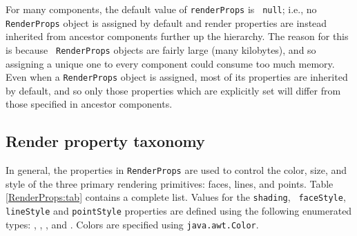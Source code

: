 For many components, the default value of {\tt renderProps} is {\tt
null}; i.e., no {\tt RenderProps} object is assigned by default and
render properties are instead inherited from ancestor components
further up the hierarchy. The reason for this is because {\tt
RenderProps} objects are fairly large (many kilobytes), and so
assigning a unique one to every component could consume too much
memory. Even when a {\tt RenderProps} object is assigned, most of its
properties are inherited by default, and so only those properties
which are explicitly set will differ from those specified in ancestor
components.

\subsection{Render property taxonomy}

In general, the properties in {\tt RenderProps} are used to control
the color, size, and style of the three primary rendering
primitives: faces, lines, and points. Table \ref{RenderProps:tab}
contains a complete list. Values for the {\tt shading}, {\tt
faceStyle}, {\tt lineStyle} and {\tt pointStyle} properties are
defined using the following enumerated types:
, 
, 
, 
and 
.
Colors are specified using {\tt java.awt.Color}.

